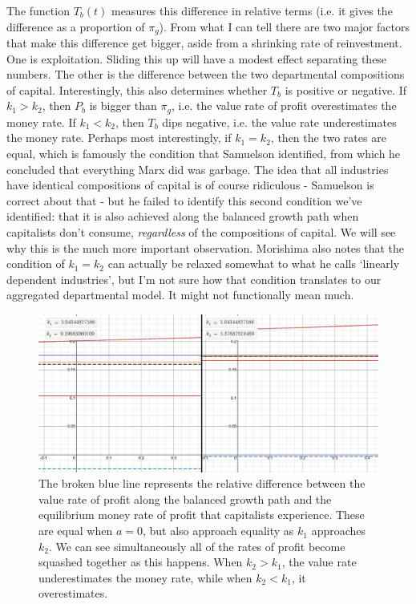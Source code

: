 \documentclass{article}
\theoremstyle{theorem}
\begin{document}
The function $T_b(t)$ measures this difference in relative terms (i.e. it gives the difference as a proportion of $\pi_g$). From what I can tell there are two major factors that make this difference get bigger, aside from a shrinking rate of reinvestment. One is exploitation. Sliding this up will have a modest effect separating these numbers. The other is the difference between the two departmental compositions of capital. Interestingly, this also determines whether $T_b$ is positive or negative. If $k_1 > k_2$, then $P_b$ is bigger than $\pi_g$, i.e. the value rate of profit overestimates the money rate. If $k_1 < k_2$, then $T_b$ dips negative, i.e. the value rate underestimates the money rate. Perhaps most interestingly, if $k_1=k_2$, then the two rates are equal, which is famously the condition that Samuelson identified, from which he concluded that everything Marx did was garbage. The idea that all industries have identical compositions of capital is of course ridiculous - Samuelson is correct about that - but he failed to identify this second condition we've identified: that it is also achieved along the balanced growth path when capitalists don't consume, \emph{regardless} of the compositions of capital. We will see why this is the much more important observation. Morishima also notes that the condition of $k_1=k_2$ can actually be relaxed somewhat to what he calls `linearly dependent industries', but I'm not sure how that condition translates to our aggregated departmental model. It might not functionally mean much.
\begin{figure}[H]
\centering
\includegraphics[scale=.5]{Images/relativeDiff1}
\caption{The broken blue line represents the relative difference between the value rate of profit along the balanced growth path and the equilibrium money rate of profit that capitalists experience. These are equal when $a=0$, but also approach equality as $k_1$ approaches $k_2$. We can see simultaneously all of the rates of profit become squashed together as this happens. When $k_2 > k_1$, the value rate underestimates the money rate, while when $k_2 < k_1$, it overestimates.}
\end{figure}
\end{document}
